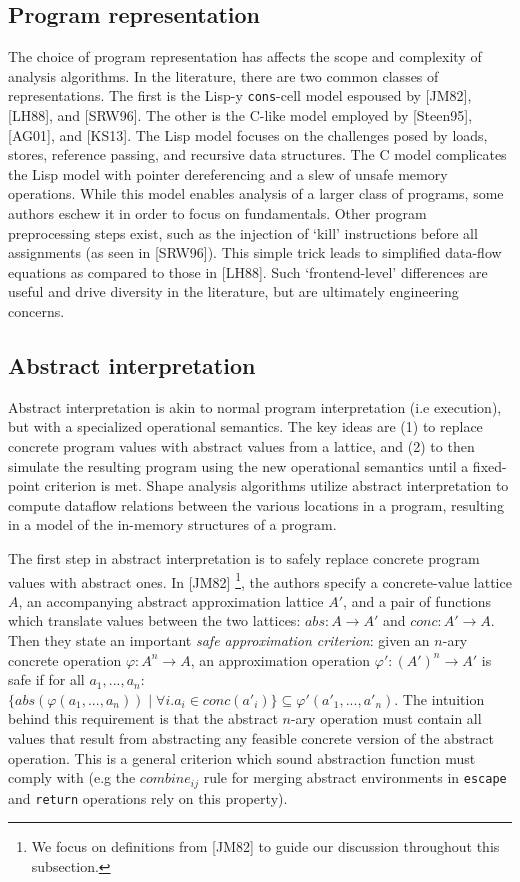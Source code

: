 \documentclass{article}
\begin{document}
\subsection{Program representation}

The choice of program representation has affects the scope and complexity of
analysis algorithms. In the literature, there are two common classes of
representations. The first is the Lisp-y \texttt{cons}-cell model espoused
by [JM82], [LH88], and [SRW96]. The other is the C-like model employed by
[Steen95], [AG01], and [KS13]. The Lisp model focuses on the challenges
posed by loads, stores, reference passing, and recursive data structures.
The C model complicates the Lisp model with pointer dereferencing and a slew
of unsafe memory operations. While this model enables analysis of a larger
class of programs, some authors eschew it in order to focus on fundamentals.
Other program preprocessing steps exist, such as the injection of `kill'
instructions before all assignments (as seen in [SRW96]). This simple trick
leads to simplified data-flow equations as compared to those in [LH88]. Such
`frontend-level' differences are useful and drive diversity in the
literature, but are ultimately engineering concerns.

\subsection{Abstract interpretation}

Abstract interpretation is akin to normal program interpretation (i.e
execution), but with a specialized operational semantics. The key ideas are
(1) to replace concrete program values with abstract values from a lattice,
and (2) to then simulate the resulting program using the new operational
semantics until a fixed-point criterion is met. Shape analysis algorithms
utilize abstract interpretation to compute dataflow relations between the
various locations in a program, resulting in a model of the in-memory
structures of a program.

The first step in abstract interpretation is to safely replace concrete
program values with abstract ones. In [JM82] \footnote{We focus on
definitions from [JM82] to guide our discussion throughout this
subsection.}, the authors specify a concrete-value lattice $A$, an
accompanying abstract approximation lattice $A'$, and a pair of functions
which translate values between the two lattices: $abs : A \rightarrow A'$
and $conc : A' \rightarrow A$. Then they state an important \textit{safe
approximation criterion}: given an $n$-ary concrete operation $\varphi : A^n
\rightarrow A$, an approximation operation $\varphi' : (A')^n \rightarrow
A'$ is safe if for all $a_1, ..., a_n$: $\{abs(\varphi(a_1, ..., a_n)) \mid
\forall i. a_i \in conc(a'_i)\} \subseteq \varphi'(a'_1, ..., a'_n)$. The
intuition behind this requirement is that the abstract $n$-ary operation
must contain all values that result from abstracting any feasible concrete
version of the abstract operation. This is a general criterion which sound
abstraction function must comply with (e.g the $combine_{ij}$ rule for
merging abstract environments in \texttt{escape} and \texttt{return}
operations rely on this property).
\end{document}
